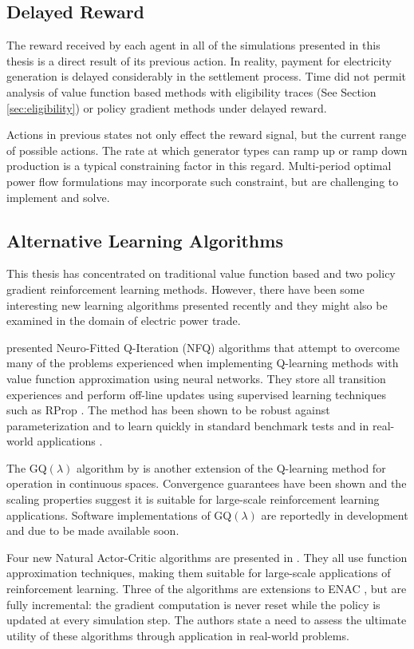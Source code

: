 \subsection{Delayed Reward}
The reward received by each agent in all of the simulations presented in this
thesis is a direct result of its previous action.  In reality, payment for
electricity generation is delayed considerably in the settlement process.  Time
did not permit analysis of value function based methods with eligibility traces
(See Section \ref{sec:eligibility}) or policy gradient methods under delayed
reward.

Actions in previous states not only effect the reward signal, but the current
range of possible actions.  The rate at which generator types can ramp up or
ramp down production is a typical constraining factor in this regard.
Multi-period optimal power flow formulations may incorporate such constraint,
but are challenging to implement and solve.

\subsection{Alternative Learning Algorithms}
This thesis has concentrated on traditional value function based and two policy
gradient reinforcement learning methods.  However, there have been some
interesting new learning algorithms presented recently and they might also be
examined in the domain of electric power trade.

 presented Neuro-Fitted Q-Iteration (NFQ) algorithms
that attempt to overcome many of the problems experienced when implementing
Q-learning methods with value function approximation using neural networks.
They store all transition experiences and perform off-line updates using
supervised learning techniques such as RProp \cite{riedmiller93}.  The method
has been shown to be robust against parameterization and to learn quickly in
standard benchmark tests and in real-world applications \cite{kietzmann09}.

The GQ$(\lambda)$ algorithm by  is another extension of the
Q-learning method for operation in continuous spaces.  Convergence guarantees
have been shown and the scaling properties suggest it is suitable for
large-scale reinforcement learning applications.  Software implementations of
GQ$(\lambda)$ are reportedly in development and due to be made available soon.

Four new Natural Actor-Critic algorithms are presented in .
They all use function approximation techniques, making them suitable for
large-scale applications of reinforcement learning.  Three of the algorithms
are extensions to ENAC \cite{peters:enac}, but are fully incremental: the
gradient computation is never reset while the policy is updated at every
simulation step.  The authors state a need to assess the ultimate utility of
these algorithms through application in real-world problems.

